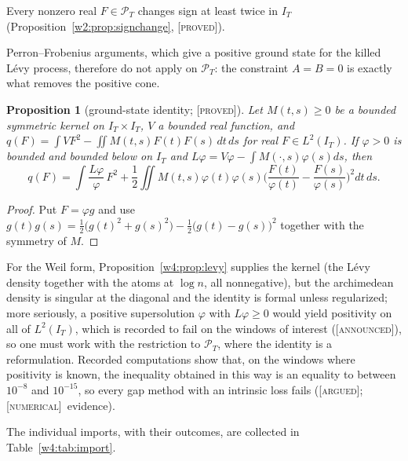 \documentclass[11pt]{amsart}
\newtheorem{proposition}[theorem]{Proposition}
\theoremstyle{definition}
\theoremstyle{remark}
\numberwithin{equation}{section}
\newcommand{\IT}{I_T}                                  %
\newcommand{\PT}{\mathcal{P}_T}                        %
\newcommand{\stag}[1]{\textsc{[#1]}}
\newcommand{\PROVED}{\stag{proved}}
\newcommand{\ARGUED}{\stag{argued}}
\newcommand{\NUM}{\stag{numerical}}
\newcommand{\ANNOUNCED}{\stag{announced}}
\begin{document}
Every nonzero real $F\in\PT$ changes sign at least twice in $\IT$
(Proposition~\ref{w2:prop:signchange}, \PROVED).

Perron--Frobenius arguments, which give a positive ground state for the killed L\'evy process, therefore do not apply on $\PT$: the
constraint $A=B=0$ is exactly what removes the positive cone.

\begin{proposition}[ground-state identity; \PROVED]\label{w4:prop:groundstate}
Let $M(t,s)\ge0$ be a bounded symmetric kernel on $\IT\times\IT$, $V$ a bounded real function, and $q(F)=\int VF^2-\iint M(t,s)F(t)F(s)\,dt\,ds$
for real $F\in L^2(\IT)$. If $\varphi>0$ is bounded and bounded below on $\IT$ and $L\varphi=V\varphi-\int M(\cdot,s)\varphi(s)ds$, then
\[
q(F)=\int\frac{L\varphi}{\varphi}\,F^2+\frac12\iint M(t,s)\varphi(t)\varphi(s)\Big(\frac{F(t)}{\varphi(t)}-\frac{F(s)}{\varphi(s)}\Big)^2dt\,ds .
\]
\end{proposition}

\begin{proof}
Put $F=\varphi g$ and use $g(t)g(s)=\frac12\big(g(t)^2+g(s)^2\big)-\frac12\big(g(t)-g(s)\big)^2$ together with the symmetry of $M$.
\end{proof}

For the Weil form, Proposition~\ref{w4:prop:levy} supplies the kernel (the L\'evy density together with the atoms at $\log n$, all
nonnegative), but the archimedean density is singular at the diagonal and the identity is formal unless regularized; more seriously, a
positive supersolution $\varphi$ with $L\varphi\ge0$ would yield positivity on all of $L^2(\IT)$, which is recorded to fail on the windows of interest (\ANNOUNCED), so one must work with
the restriction to $\PT$, where the identity is a reformulation. Recorded computations show that, on the windows where positivity is
known, the inequality obtained in this way is an equality to between $10^{-8}$ and $10^{-15}$, so every gap method with an intrinsic
loss fails (\ARGUED; \NUM\ evidence).

The individual imports, with their outcomes, are collected in Table~\ref{w4:tab:import}.
\end{document}
